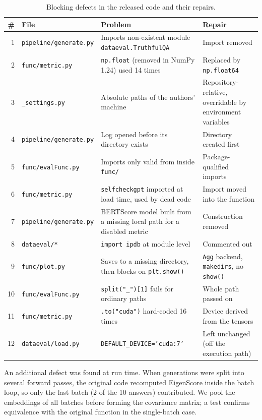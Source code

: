 \documentclass[conference]{IEEEtran}
\begin{document}
\begin{table}[t]
\centering\small
\caption{Blocking defects in the released code and their repairs.}\label{tab:bugs}
\begin{tabular}{@{}rp{3.6cm}p{6.4cm}p{5.6cm}@{}}
\toprule
\# & File & Problem & Repair\\
\midrule
1 & \texttt{pipeline/generate.py} & Imports non-existent module \texttt{dataeval.TruthfulQA} & Import removed\\
2 & \texttt{func/metric.py} & \texttt{np.float} (removed in NumPy 1.24) used 14 times & Replaced by \texttt{np.float64}\\
3 & \texttt{\_settings.py} & Absolute paths of the authors' machine & Repository-relative, overridable by environment variables\\
4 & \texttt{pipeline/generate.py} & Log opened before its directory exists & Directory created first\\
5 & \texttt{func/evalFunc.py} & Imports only valid from inside \texttt{func/} & Package-qualified imports\\
6 & \texttt{func/metric.py} & \texttt{selfcheckgpt} imported at load time, used by dead code & Import moved into the function\\
7 & \texttt{pipeline/generate.py} & BERTScore model built from a missing local path for a disabled metric & Construction removed\\
8 & \texttt{dataeval/*} & \texttt{import ipdb} at module level & Commented out\\
9 & \texttt{func/plot.py} & Saves to a missing directory, then blocks on \texttt{plt.show()} & \texttt{Agg} backend, \texttt{makedirs}, no \texttt{show()}\\
10 & \texttt{func/evalFunc.py} & \texttt{split("\_")[1]} fails for ordinary paths & Whole path passed on\\
11 & \texttt{func/metric.py} & \texttt{.to("cuda")} hard-coded 16 times & Device derived from the tensors\\
12 & \texttt{dataeval/load.py} & \texttt{DEFAULT\_DEVICE='cuda:7'} & Left unchanged (off the execution path)\\
\bottomrule
\end{tabular}
\end{table}

An additional defect was found at run time. When generations were split into several forward passes, the original code recomputed EigenScore inside the batch loop, so only the last batch (2 of the 10 answers) contributed. We pool the embeddings of all batches before forming the covariance matrix; a test confirms equivalence with the original function in the single-batch case.
\end{document}

